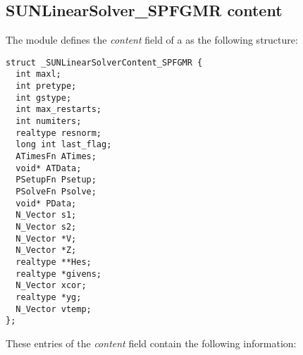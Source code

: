 \subsection{SUNLinearSolver\_SPFGMR content}
\label{ss:sunlinsol_spfgmr_content}

The {\sunlinsolspfgmr} module defines the \textit{content} field of a
 as the following structure:
\begin{verbatim}
struct _SUNLinearSolverContent_SPFGMR {
  int maxl;
  int pretype;
  int gstype;
  int max_restarts;
  int numiters;
  realtype resnorm;
  long int last_flag;
  ATimesFn ATimes;
  void* ATData;
  PSetupFn Psetup;
  PSolveFn Psolve;
  void* PData;
  N_Vector s1;
  N_Vector s2;
  N_Vector *V;
  N_Vector *Z;
  realtype **Hes;
  realtype *givens;
  N_Vector xcor;
  realtype *yg;
  N_Vector vtemp;
};
\end{verbatim}
These entries of the \emph{content} field contain the following
information:
